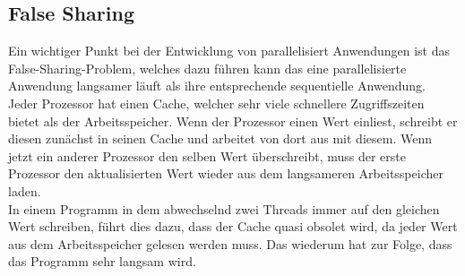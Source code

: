 \subsection {False Sharing}
Ein wichtiger Punkt bei der Entwicklung von parallelisiert Anwendungen ist das False-Sharing-Problem, welches dazu führen kann das eine parallelisierte Anwendung langsamer läuft als ihre entsprechende sequentielle Anwendung.\\
Jeder Prozessor hat einen Cache, welcher sehr viele schnellere Zugriffszeiten bietet als der Arbeitsspeicher. Wenn der Prozessor einen Wert einliest, schreibt er diesen zunächst in seinen Cache und arbeitet von dort aus mit diesem. Wenn jetzt ein anderer Prozessor den selben Wert überschreibt, muss der erste Prozessor den aktualisierten Wert wieder aus dem langsameren Arbeitsspeicher laden.\\
In einem Programm in dem abwechselnd zwei Threads immer auf den gleichen Wert schreiben, führt dies dazu, dass der Cache quasi obsolet wird, da jeder Wert aus dem Arbeitsspeicher gelesen werden muss. Das wiederum hat zur Folge, dass das Programm sehr langsam wird.